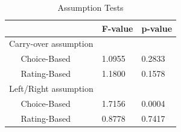 \vspace{3mm}
\begin{table}[H]
\caption{Assumption Tests}
\label{tab:art2-app-tab7}
\begin{tabular}{@{}p{0.3cm}p{4cm}p{2cm}p{2cm}@{}}
\toprule
\midrule
                          & & F-value & p-value \\ \midrule
\multicolumn{2}{l}{Carry-over assumption}    & &                  \\ 
    & Choice-Based            & 1.0955          & 0.2833               \\ 
    & Rating-Based            & 1.1800          & 0.1578                \\ 
\multicolumn{2}{l}{Left/Right assumption}       & &                \\ 
    & Choice-Based            & 1.7156          & 0.0004                   \\ 
    & Rating-Based            & 0.8778          & 0.7417              \\ \midrule \bottomrule
\end{tabular}
\end{table}

